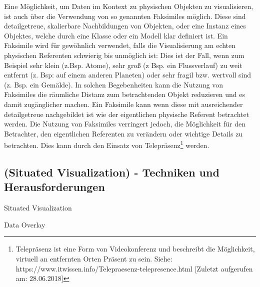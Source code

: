 \cite{WesleyWillettYvonneJansen}Eine Möglichkeit, um Daten im Kontext zu physischen Objekten zu visualisieren, ist auch über die Verwendung von so genannten Faksimiles möglich. Diese sind detailgetreue, skalierbare Nachbildungen von Objekten, oder eine Instanz eines Objektes, welche durch eine Klasse oder ein Modell klar definiert ist. Ein Faksimile wird für gewöhnlich verwendet, falls die Visualisierung am echten physischen Referenten schwierig bis unmöglich ist: Dies ist der Fall, wenn zum Beispiel sehr klein (z.Bsp. Atome), sehr groß (z Bsp. ein Flussverlauf) zu weit entfernt (z. Bsp: auf einem anderen Planeten) oder sehr fragil bzw. wertvoll sind (z. Bsp. ein Gemälde). 
In solchen Begebenheiten kann die Nutzung von Faksimiles die räumliche Distanz zum betrachtenden Objekt reduzieren und es damit zugänglicher machen. Ein Faksimile kann wenn diese mit ausreichender detailgetreue nachgebildet ist wie der eigentlichen physische Referent betrachtet werden. Die Nutzung von Faksimiles verringert jedoch, die Möglichkeit für den Betrachter, den eigentlichen Referenten zu verändern oder wichtige Details zu betrachten. Dies kann durch den Einsatz von Telepräsenz\footnote{Telepräsenz ist eine Form von Videokonferenz und beschreibt die Möglichkeit, virtuell an entfernten Orten Präsent zu sein. Siehe: https://www.itwissen.info/Telepraesenz-telepresence.html [Zuletzt aufgerufen am: 28.06.2018]} werden. 

\subsection{(Situated Visualization) - Techniken und Herausforderungen}

Situated Visualization 



Data Overlay 



